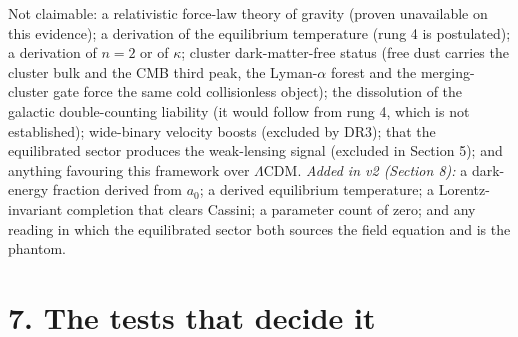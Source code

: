 \documentclass[
  11pt,
]{article}
\begin{document}
Not claimable: a relativistic force-law theory of gravity (proven
unavailable on this evidence); a derivation of the equilibrium
temperature (rung 4 is postulated); a derivation of \(n = 2\) or of
\(\kappa\); cluster dark-matter-free status (free dust carries the
cluster bulk and the CMB third peak, the Lyman-\(\alpha\) forest and the
merging-cluster gate force the same cold collisionless object); the
dissolution of the galactic double-counting liability (it would follow
from rung 4, which is not established); wide-binary velocity boosts
(excluded by DR3); that the equilibrated sector produces the
weak-lensing signal (excluded in Section 5); and anything favouring this
framework over \(\Lambda\)CDM. \emph{Added in v2 (Section 8):} a
dark-energy fraction derived from \(a_0\); a derived equilibrium
temperature; a Lorentz-invariant completion that clears Cassini; a
parameter count of zero; and any reading in which the equilibrated
sector both sources the field equation and is the phantom.

\section{7. The tests that decide it}\label{the-tests-that-decide-it}
\end{document}
